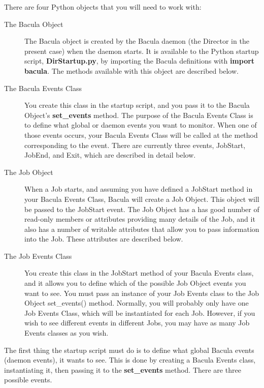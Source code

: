 There are four Python objects that you will need to work with:
\begin{description}
\item [The Bacula Object]
   The Bacula object is created by the Bacula daemon (the Director
   in the present case) when the daemon starts. It is available to
   the Python startup script, {\bf DirStartup.py}, by importing the
   Bacula definitions with {\bf import bacula}. The methods
   available with this object are described below. 

\item [The Bacula Events Class]
   You create this class in the startup script, and you pass
   it to the Bacula Object's {\bf set\_events} method. The 
   purpose of the Bacula Events Class is to define what global
   or daemon events you want to monitor. When one of those events
   occurs, your Bacula Events Class will be called at the method
   corresponding to the event. There are currently three events,
   JobStart, JobEnd, and Exit, which are described in detail below.
   
\item [The Job Object]
   When a Job starts, and assuming you have defined a JobStart method
   in your Bacula Events Class, Bacula will create a Job Object. This
   object will be passed to the JobStart event. The Job Object has a
   has good number of read-only members or attributes providing many
   details of the Job, and it also has a number of writable attributes
   that allow you to pass information into the Job.  These attributes
   are described below.
   
\item [The Job Events Class]
   You create this class in the JobStart method of your Bacula Events
   class, and it allows you to define which of the possible Job Object
   events you want to see. You must pass an instance of your Job Events
   class to the Job Object set\_events() method.
   Normally, you will probably only have one
   Job Events Class, which will be instantiated for each Job. However,
   if you wish to see different events in different Jobs, you may have
   as many Job Events classes as you wish.
\end{description}


The first thing the startup script must do is to define what global Bacula
events (daemon events), it wants to see. This is done by creating a 
Bacula Events class, instantiating it, then passing it to the 
{\bf set\_events} method. There are three possible
events.

